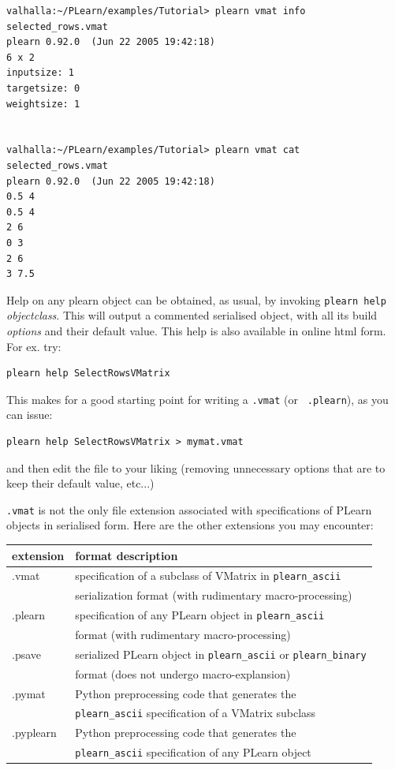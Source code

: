 \documentclass[11pt]{book}
\begin{document}
\begin{verbatim}
valhalla:~/PLearn/examples/Tutorial> plearn vmat info selected_rows.vmat
plearn 0.92.0  (Jun 22 2005 19:42:18)
6 x 2
inputsize: 1
targetsize: 0
weightsize: 1


valhalla:~/PLearn/examples/Tutorial> plearn vmat cat selected_rows.vmat
plearn 0.92.0  (Jun 22 2005 19:42:18)
0.5 4
0.5 4
2 6
0 3
2 6
3 7.5
\end{verbatim}

Help on any plearn object can be obtained, as usual, by invoking
\verb!plearn help ! {\em objectclass}. This will output a commented serialised object, with all its build {\em
  options} and their default value. This help is also available in online html form. For ex. try:

\begin{verbatim}
plearn help SelectRowsVMatrix
\end{verbatim}

This makes for a good starting point for writing a {\tt .vmat} (or {\tt
  .plearn}), as you can issue:
\begin{verbatim}
plearn help SelectRowsVMatrix > mymat.vmat
\end{verbatim}
and then edit the file to your liking (removing unnecessary options that
are to keep their default value, etc...)

{\tt .vmat} is not the only file extension associated with specifications
of PLearn objects in serialised form. Here are the other extensions you may
encounter:

\begin{center}
\begin{tabular}{|l|l|} \hline 
{\bf extension} & {\bf format description} \\ \hline
.vmat           & specification of a subclass of VMatrix in \verb!plearn_ascii!    \\ 
                & serialization format (with rudimentary macro-processing)  \\ \hline
.plearn         & specification of any PLearn object in \verb!plearn_ascii!        \\
                & format (with rudimentary macro-processing)                \\ \hline
.psave          & serialized PLearn object in \verb!plearn_ascii! or \verb!plearn_binary! \\
                & format (does not undergo macro-explansion)                \\ \hline
.pymat          & Python preprocessing code that generates the              \\ 
                & \verb!plearn_ascii! specification of a VMatrix subclass          \\ \hline 
.pyplearn       & Python preprocessing code that generates the              \\ 
                & \verb!plearn_ascii! specification of any PLearn object           \\ \hline
\end{tabular}
\end{center}
\end{document}

